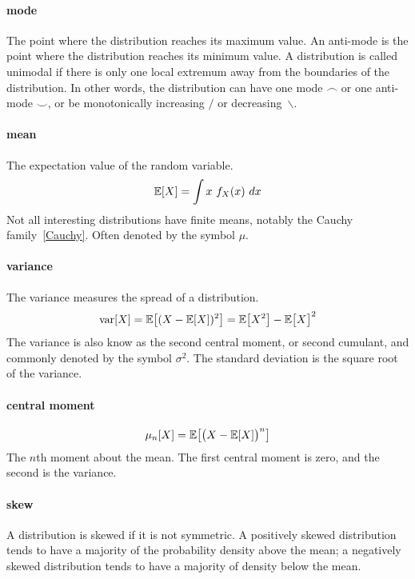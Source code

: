 \paragraph*{mode}
The point where the distribution reaches its maximum value. An anti-mode is the point where the distribution reaches its minimum value. 
A distribution is called unimodal if there is only one local extremum away from the boundaries of the distribution. In other words, the distribution can have one mode $\frown$ or one anti-mode $\smile$, or be monotonically increasing $/$ or decreasing~$\backslash$.




\paragraph*{mean} The expectation value of the random variable. 
\[
\operatorname{\mathbb E}[X] = \int x\ f_X(x)\ dx 
\notag
\]
Not all interesting distributions have finite means, notably the Cauchy family~\eqref{Cauchy}. Often denoted by the symbol $\mu$.


\paragraph*{variance} The variance measures the spread of a distribution.
\[
\op{var}[X] =  
 \expect\Left[ (X-\expect[X])^2\Right] = \expect\bigl[X^2\bigr] - \expect\bigl[X\bigr]^2
\notag \checked
\]
The variance is also know as the second central moment, or second cumulant, and commonly denoted by the symbol $\sigma^2$. The standard deviation is the square root of the variance.


\paragraph*{central moment}
\[
\mu_n[X] =  
\expect\Left[ \bigl(X-\expect[X]\bigr)^n\Right]
\checked 
\]
The $n$th moment about the mean. The first central moment is zero, and the second is the variance. 

\paragraph*{skew}   A distribution is skewed if it is not symmetric. A positively skewed distribution tends to have a majority of the probability density above the mean; a negatively skewed distribution tends to have a majority of density below the mean. 

